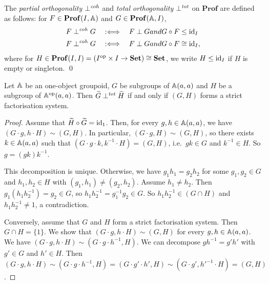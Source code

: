 \newcommand{\ProfCat}{\mathbf{Prof}}
\newcommand{\CohProf}{\mathbf{CohProf}}
\newcommand{\TotProf}{\mathbf{TotProf}}
\begin{definition}
    The \emph{partial orthogonality} \( \mathrel{\bot}^{\mathit{coh}} \) and \emph{total orthogonality} \( \mathrel{\bot}^{\mathit{tot}} \) on \( \ProfCat \) are defined as follows:
    for \( F \in \ProfCat(I, \Grp) \) and \( G \in \ProfCat(\Grp, I) \),
    \begin{align*}
        F \mathrel{\bot}^{\mathit{coh}} G &\quad:\Longleftrightarrow\quad F \mathrel{\bot} G \relax{ and } G \circ F \le \mathrm{id}_I \\ 
        F \mathrel{\bot}^{\mathit{coh}} G &\quad:\Longleftrightarrow\quad F \mathrel{\bot} G \relax{ and } G \circ F \cong \mathrm{id}_I,
    \end{align*}
    where for \( H \in \ProfCat(I,I) = (I^\op \times I \to \Set) \cong \Set \), we write \( H \le \mathrm{id}_I \) if \( H \) is empty or singleton.
    \qed
\end{definition}

\begin{proposition}
    Let \( \mathbb{A} \) be an one-object groupoid, \( G \) be subgroups of \( \mathbb{A}(a,a) \) and \( H \) be a subgroup of \( \mathbb{A}^{\mathrm{op}}(a,a) \).
    Then \( \widetilde{G} \mathrel{\bot}^{\mathit{tot}} \widetilde{H} \) if and only if \( (G, H) \) forms a strict factorisation system.
\end{proposition}
\begin{proof}
    Assume that \( \widetilde{H} \circ \widetilde{G} = \mathrm{id}_1 \).
    Then, for every \( g, h \in \mathbb{A}(a,a) \), we have \( (G \cdot g, h \cdot H) \sim (G, H) \).
    In particular, \( (G \cdot g, H) \sim (G, H) \), so there exists \( k \in \mathbb{A}(a,a) \) such that \( (G \cdot g \cdot k, k^{-1} \cdot H) = (G, H) \), i.e.~\( gk \in G \) and \( k^{-1} \in H \).
    So \( g = (gk) k^{-1} \).

    This decomposition is unique.
    Otherwise, we have \( g_1 h_1 = g_2 h_2 \) for some \( g_1, g_2 \in G \) and \( h_1, h_2 \in H \) with \( (g_1, h_1) \neq (g_2, h_2) \).
    Assume \( h_1 \neq h_2 \).
    Then \( g_1 (h_1 h_2^{-1}) = g_2 \in G \), so \( h_1 h_2^{-1} = g_1^{-1} g_2 \in G \).
    So \( h_1 h_2^{-1} \in (G \cap H) \) and \( h_1 h_2^{-1} \neq 1 \), a contradiction.

    Conversely, assume that \( G \) and \( H \) form a strict factorisation system.
    Then \( G \cap H = \{ 1 \} \).
    We show that \( (G \cdot g, h \cdot H) \sim (G, H) \) for every \( g, h \in \mathbb{A}(a,a) \).
    We have \( (G \cdot g, h \cdot H) \sim (G \cdot g \cdot h^{-1}, H) \).
    We can decompose \( g h^{-1} = g' h' \) with \( g' \in G \) and \( h' \in H \).
    Then \( (G \cdot g, h \cdot H) \sim (G \cdot g \cdot h^{-1}, H) = (G \cdot g' \cdot h', H) \sim (G \cdot g', h'^{-1} \cdot H) = (G, H) \).
\end{proof}

